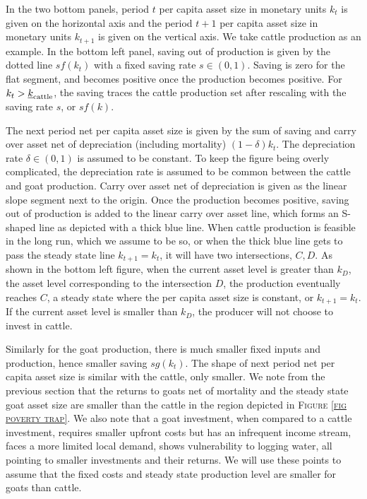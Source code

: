 	In the two bottom panels, period $t$ per capita asset size in monetary units $k_{t}$ is given on the horizontal axis and the period $t+1$ per capita asset size in monetary units $k_{t+1}$ is given on the vertical axis. We take cattle production as an example. In the bottom left panel, saving out of production is given by the dotted line $sf(k_{t})$ with a fixed saving rate $s\in(0, 1)$. Saving is zero for the flat segment, and becomes positive once the production becomes positive. For $k_{t}>\underline{k}_{\mbox{\scriptsize cattle}}$, the saving traces the cattle production set after rescaling with the saving rate $s$, or $sf(k)$. 
	
	The next period net per capita asset size is given by the sum of saving and carry over asset net of depreciation (including mortality) $(1-\delta)k_{t}$.  The depreciation rate $\delta\in(0, 1)$ is assumed to be constant. To keep the figure being overly complicated, the depreciation rate is assumed to be common between the cattle and goat production. Carry over asset net of depreciation is given as the linear slope segment next to the origin. Once the production becomes positive, saving out of production is added to the linear carry over asset line, which forms an S-shaped line as depicted with a thick blue line. When cattle production is feasible in the long run, which we assume to be so, or when the thick blue line gets to pass the steady state line $k_{t+1}=k_{t}$, it will have two intersections, $C, D$. As shown in the bottom left figure, when the current asset level is greater than $k_{D}$, the asset level corresponding to the intersection $D$, the production eventually reaches $C$, a steady state where the per capita asset size is constant, or $k_{t+1}=k_{t}$. If the current asset level is smaller than $k_{D}$, the producer will not choose to invest in cattle.
	
	Similarly for the goat production, there is much smaller fixed inputs and production, hence smaller saving $sg(k_{t})$. The shape of next period net per capita asset size is similar with the cattle, only smaller. We note from the previous section that the returns to goats net of mortality and the steady state goat asset size are smaller than the cattle in the region depicted in \textsc{\small Figure \ref{fig poverty trap}}. We also note that a goat investment, when compared to a cattle investment, requires smaller upfront costs but has an infrequent income stream, faces a more limited local demand, shows vulnerability to logging water, all pointing to smaller investments and their returns. We will use these points to assume that the fixed costs and steady state production level are smaller for goats than cattle.  

